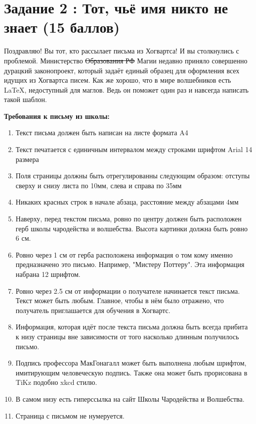 \documentclass[12pt, a4paper, oneside]{article}
\begin{document}
	
\section*{Задание 2 :  Тот, чьё имя никто не знает (15 баллов)}

Поздравляю! Вы тот, кто рассылает письма из Хогвартса! И вы столкнулись с проблемой. Министерство \sout{Образования РФ}  Магии недавно приняло совершенно дурацкий законопроект, который задаёт единый образец для оформления всех идущих из Хогвартса писем. Как же хорошо, что в мире волшебников есть \LaTeX{}, недоступный для маглов. Ведь он поможет один раз и навсегда написать такой шаблон. 

\textbf{Требования к письму из школы:}
\begin{enumerate}
\item Текст письма должен быть написан на листе формата A4
\item Текст печатается с единичным интервалом между строками шрифтом Arial 14 размера
\item Поля страницы должны быть отрегулированны следующим образом: отступы сверху и снизу листа по 10мм, слева и справа по 35мм
\item Никаких красных строк в начале абзаца, расстояние между абзацами 4мм
\item  Наверху, перед текстом письма, ровно по центру должен быть расположен герб школы чародейства и волшебства. Высота картинки должна быть ровно 6 см.
\item  Ровно через 1 см от герба расположена информация о том кому именно предназначено это письмо. Например, "Мистеру Поттеру". Эта информация набрана 12 шрифтом.
\item  Ровно через 2.5 см от информации о получателе начинается текст письма. Текст может быть любым. Главное, чтобы в нём было отражено, что получатель приглашается для обучения в Хогвартс.
\item  Информация, которая идёт после текста письма должна быть всегда прибита к низу страницы вне зависимости от того насколько длинным получилось письмо.
\item Подпись профессора МакГонагалл может быть выполнена любым шрифтом, имитирующим человеческую подпись. Также она может быть прорисована в TiKz подобно xkcd стилю.
\item  В самом низу есть гиперссылка на сайт Школы Чародейства и Волшебства.
\item Страница с письмом не нумеруется.
\end{enumerate}
\end{document}

